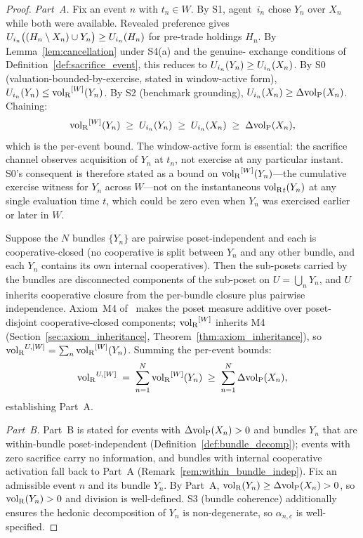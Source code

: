 \begin{proof}
\emph{Part~A.}
Fix an event $n$ with $t_n \in W$.  By S1, agent~$i_n$ chose
$Y_n$ over $X_n$ while both were available.  Revealed preference
gives $U_{i_{n}}\bigl((H_n \setminus X_n) \cup Y_n\bigr) \geq
U_{i_{n}}(H_n)$ for pre-trade holdings $H_n$.  By
Lemma~\ref{lem:cancellation} under S4(a) and the genuine-
exchange conditions of Definition~\ref{def:sacrifice_event},
this reduces to $U_{i_{n}}(Y_n) \geq U_{i_{n}}(X_n)$.  By S0
(valuation-bounded-by-exercise, stated in window-active
form), $U_{i_{n}}(Y_n) \leq {\operatorname{vol}_{\mathrm{R}}}^{[W]}(Y_n)$.  By S2
(benchmark grounding), $U_{i_{n}}(X_n) \geq \Delta{\operatorname{vol}_{\mathrm{P}}}(X_n)$.
Chaining:
\[
  {\operatorname{vol}_{\mathrm{R}}}^{[W]}(Y_n) \;\geq\; U_{i_{n}}(Y_n)
  \;\geq\; U_{i_{n}}(X_n)
  \;\geq\; \Delta{\operatorname{vol}_{\mathrm{P}}}(X_n),
\]
which is the per-event bound.  The window-active form is
essential: the sacrifice channel observes acquisition of $Y_n$
at $t_n$, not exercise at any particular instant.  S0's
consequent is therefore stated as a bound on
${\operatorname{vol}_{\mathrm{R}}}^{[W]}(Y_n)$---the cumulative exercise witness for $Y_n$
across $W$---not on the instantaneous ${\operatorname{vol}_{\mathrm{R}}}_t(Y_n)$ at any
single evaluation time $t$, which could be zero even when
$Y_n$ was exercised earlier or later in $W$.

Suppose the $N$ bundles $\{Y_n\}$ are pairwise poset-independent
and each is cooperative-closed (no cooperative is split between
$Y_n$ and any other bundle, and each $Y_n$ contains its own
internal cooperatives).  Then the sub-posets carried by the
bundles are disconnected components of the sub-poset on
$U = \bigcup_n Y_n$, and $U$ inherits cooperative closure from
the per-bundle closure plus pairwise independence.
Axiom~M4 of~\citep[Proposition~1]{lasser2026poset} makes the
poset measure additive over poset-disjoint cooperative-closed
components; ${\operatorname{vol}_{\mathrm{R}}}^{[W]}$ inherits M4
(Section~\ref{sec:axiom_inheritance},
Theorem~\ref{thm:axiom_inheritance}), so
${\operatorname{vol}_{\mathrm{R}}}^{U,[W]} = \sum_n {\operatorname{vol}_{\mathrm{R}}}^{[W]}(Y_n)$.  Summing the
per-event bounds:
\[
  {\operatorname{vol}_{\mathrm{R}}}^{U,[W]} \;=\; \sum_{n=1}^N {\operatorname{vol}_{\mathrm{R}}}^{[W]}(Y_n)
  \;\geq\; \sum_{n=1}^N \Delta{\operatorname{vol}_{\mathrm{P}}}(X_n),
\]
establishing Part~A.

\emph{Part~B.}
Part~B is stated for events with $\Delta{\operatorname{vol}_{\mathrm{P}}}(X_n) > 0$ and
bundles $Y_n$ that are within-bundle poset-independent
(Definition~\ref{def:bundle_decomp}); events with zero sacrifice
carry no information, and bundles with internal cooperative
activation fall back to Part~A
(Remark~\ref{rem:within_bundle_indep}).  Fix an admissible event
$n$ and its bundle $Y_n$.  By Part~A, ${\operatorname{vol}_{\mathrm{R}}}(Y_n) \geq
\Delta{\operatorname{vol}_{\mathrm{P}}}(X_n) > 0$, so ${\operatorname{vol}_{\mathrm{R}}}(Y_n) > 0$ and division is
well-defined.  S3 (bundle coherence) additionally ensures the
hedonic decomposition of $Y_n$ is non-degenerate, so
$\alpha_{n,c}$ is well-specified.


\end{proof}
